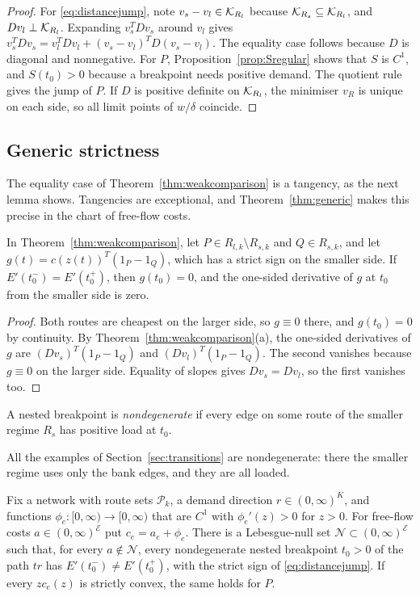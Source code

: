 \begin{proof}
For \eqref{eq:distancejump}, note $v_s-v_l\in\mathcal K_{R_l}$ because $\mathcal K_{R_s}\subseteq\mathcal K_{R_l}$, and $Dv_l\perp\mathcal K_{R_l}$. Expanding $v_s^TDv_s$ around $v_l$ gives $v_s^TDv_s=v_l^TDv_l+(v_s-v_l)^TD(v_s-v_l)$. The equality case follows because $D$ is diagonal and nonnegative. For $P$, Proposition~\ref{prop:Sregular} shows that $S$ is $C^1$, and $S(t_0)>0$ because a breakpoint needs positive demand. The quotient rule gives the jump of $P$. If $D$ is positive definite on $\mathcal K_{R_l}$, the minimiser $v_R$ is unique on each side, so all limit points of $w/\delta$ coincide.
\end{proof}

\subsection{Generic strictness}

The equality case of Theorem~\ref{thm:weakcomparison} is a tangency, as the next lemma shows. Tangencies are exceptional, and Theorem~\ref{thm:generic} makes this precise in the chart of free-flow costs.

\begin{lemma}\label{lem:tangencycomparison}
In Theorem~\ref{thm:weakcomparison}, let $P\in R_{l,k}\setminus R_{s,k}$ and $Q\in R_{s,k}$, and let $g(t)=c(z(t))^T(1_P-1_Q)$, which has a strict sign on the smaller side. If $E'(t_0^-)=E'(t_0^+)$, then $g(t_0)=0$, and the one-sided derivative of $g$ at $t_0$ from the smaller side is zero.
\end{lemma}
\begin{proof}
Both routes are cheapest on the larger side, so $g\equiv0$ there, and $g(t_0)=0$ by continuity. By Theorem~\ref{thm:weakcomparison}(a), the one-sided derivatives of $g$ are $(Dv_s)^T(1_P-1_Q)$ and $(Dv_l)^T(1_P-1_Q)$. The second vanishes because $g\equiv0$ on the larger side. Equality of slopes gives $Dv_s=Dv_l$, so the first vanishes too.
\end{proof}

\begin{definition}\label{def:nondegenerate}
A nested breakpoint is \emph{nondegenerate} if every edge on some route of the smaller regime $R_s$ has positive load at $t_0$.
\end{definition}

All the examples of Section~\ref{sec:transitions} are nondegenerate: there the smaller regime uses only the bank edges, and they are all loaded.

\begin{theorem}\label{thm:generic}
Fix a network with route sets $\mathcal P_k$, a demand direction $r\in(0,\infty)^K$, and functions $\phi_e:[0,\infty)\to[0,\infty)$ that are $C^1$ with $\phi_e'(z)>0$ for $z>0$. For free-flow costs $a\in(0,\infty)^{\mathcal E}$ put $c_e=a_e+\phi_e$. There is a Lebesgue-null set $\mathcal N\subset(0,\infty)^{\mathcal E}$ such that, for every $a\notin\mathcal N$, every nondegenerate nested breakpoint $t_0>0$ of the path $tr$ has $E'(t_0^-)\ne E'(t_0^+)$, with the strict sign of \eqref{eq:distancejump}. If every $zc_e(z)$ is strictly convex, the same holds for $P$.
\end{theorem}

